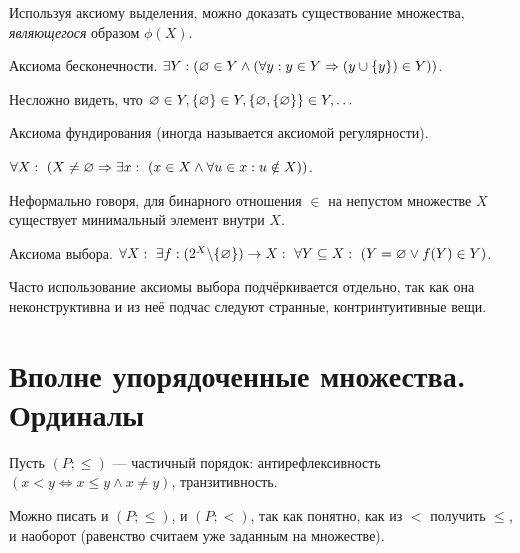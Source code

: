 \documentclass[a4paper]{report}
\begin{document}
{        Используя аксиому выделения, можно доказать существование множества, \emph{являющегося} образом $\phi(X)$.
        \item Аксиома бесконечности. $\exists Y : (\varnothing \in Y \land (\forall y : y \in Y \Rightarrow (y \cup \{y\}) \in Y))$.

        Несложно видеть, что $\varnothing \in Y, \{\varnothing\} \in Y, \{\varnothing, \{\varnothing\}\} \in Y, \dots$
        \item Аксиома фундирования (иногда называется аксиомой регулярности).

        $\forall X:~(X \ne \varnothing \Rightarrow \exists x : ~(x \in X \land \forall u \in x : u \notin X))$.

        Неформально говоря, для бинарного отношения $\in$ на непустом множестве $X$ существует минимальный элемент внутри $X$.

        \begin{samepage}
        \end{samepage}
        \item Аксиома выбора. $\forall X : ~\exists f : (2^X \backslash \{\varnothing\}) \rightarrow X : ~ \forall Y \subseteq X : ~(Y = \varnothing \lor f(Y) \in Y)$.

        Часто использование аксиомы выбора подчёркивается отдельно, так как она неконструктивна и из неё подчас следуют странные, контринтуитивные вещи.
    }



    \section{Вполне упорядоченные множества. Ординалы}
    Пусть $(P; \le)$ --- частичный порядок: антирефлексивность $(x < y \iff x \le y \land x \ne y)$, транзитивность.

    Можно писать и $(P; \le)$, и $(P; <)$, так как понятно, как из $<$ получить $\le$, и наоборот (равенство считаем уже заданным на множестве).
\end{document}
